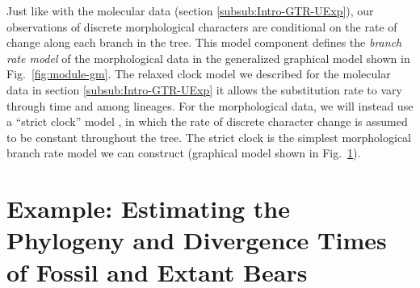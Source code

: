 
Just like with the molecular data (section \ref{subsub:Intro-GTR-UExp}), our observations of discrete morphological characters are conditional on the rate of change along each branch in the tree. 
This model component defines the \textit{branch rate model} of the morphological data in the generalized graphical model shown in Fig.\ \ref{fig:module-gm}.
The relaxed clock model we described for the molecular data in section \ref{subsub:Intro-GTR-UExp} it allows the substitution rate to vary through time and among lineages. 
For the morphological data, we will instead use a ``strict clock'' model \citep{Zuckerkandl1962}, in which the rate of discrete character change is assumed to be constant throughout the tree.
The strict clock is the simplest morphological branch rate model we can construct (graphical model shown in Fig.\ \ref{fig:morph_clock_gm}).

\begin{figure}[h!]
\label{fig:morph_clock_gm}
\end{figure}

\bigskip
\section{Example: Estimating the Phylogeny and Divergence Times of Fossil and Extant Bears}\label{sect:Exercise}

